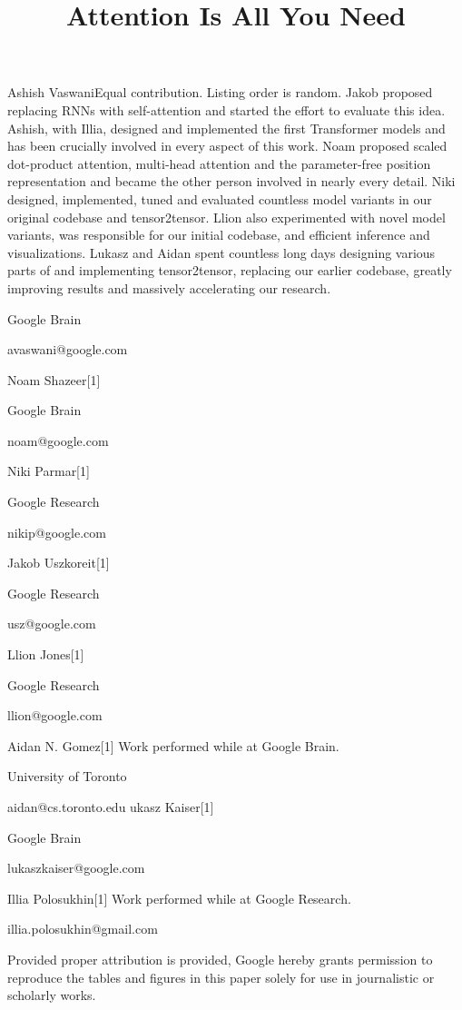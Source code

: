 \documentclass[11pt,a4paper]{article}
\title{Attention Is All You Need}
\begin{document}
\maketitle

Ashish VaswaniEqual contribution. Listing order is random. Jakob proposed replacing RNNs with self-attention and started the effort to evaluate this idea.
Ashish, with Illia, designed and implemented the first Transformer models and has been crucially involved in every aspect of this work. Noam proposed scaled dot-product attention, multi-head attention and the parameter-free position representation and became the other person involved in nearly every detail. Niki designed, implemented, tuned and evaluated countless model variants in our original codebase and tensor2tensor. Llion also experimented with novel model variants, was responsible for our initial codebase, and efficient inference and visualizations. Lukasz and Aidan spent countless long days designing various parts of and implementing tensor2tensor, replacing our earlier codebase, greatly improving results and massively accelerating our research.

 Google Brain

 avaswani@google.com

 Noam Shazeer[1]

 Google Brain

 noam@google.com

 Niki Parmar[1]

 Google Research

 nikip@google.com
 
 Jakob Uszkoreit[1]

 Google Research

 usz@google.com

 Llion Jones[1]

 Google Research

 llion@google.com
 
 Aidan N. Gomez[1] Work performed while at Google Brain.

 University of Toronto

 aidan@cs.toronto.edu
 ukasz Kaiser[1]

 Google Brain

 lukaszkaiser@google.com

 Illia Polosukhin[1] Work performed while at Google Research.

 illia.polosukhin@gmail.com

Provided proper attribution is provided, Google hereby grants permission to reproduce the tables and figures in this paper solely for use in journalistic or scholarly works.
\end{document}
